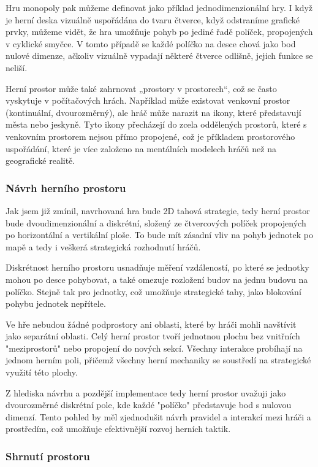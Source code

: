 Hru monopoly pak můžeme definovat jako příklad jednodimenzionální hry. I když je herní deska vizuálně uspořádána do tvaru čtverce, když odstraníme grafické prvky, můžeme vidět, že hra umožňuje pohyb po jediné řadě políček, propojených v cyklické smyčce. V tomto případě se každé políčko na desce chová jako bod nulové dimenze, ačkoliv vizuálně vypadají některé čtverce odlišně, jejich funkce se neliší.

Herní prostor může také zahrnovat „prostory v prostorech“, což se často vyskytuje v počítačových hrách. Například může existovat venkovní prostor (kontinuální, dvourozměrný), ale hráč může narazit na ikony, které představují města nebo jeskyně. Tyto ikony přecházejí do zcela oddělených prostorů, které s venkovním prostorem nejsou přímo propojené, což je příkladem prostorového uspořádání, které je více založeno na mentálních modelech hráčů než na geografické realitě.

\subsubsection{Návrh herního prostoru}

Jak jsem již zmínil, navrhovaná hra bude 2D tahová strategie, tedy herní prostor bude dvoudimenzionální a diskrétní, složený ze čtvercových políček propojených po horizontální a vertikální ploše. To bude mít zásadní vliv na pohyb jednotek po mapě a tedy i veškerá strategická rozhodnutí hráčů.

Diskrétnost herního prostoru usnadňuje měření vzdáleností, po které se jednotky mohou po desce pohybovat, a také omezuje rozložení budov na jednu budovu na políčko. Stejně tak pro jednotky, což umožňuje strategické tahy, jako blokování pohybu jednotek nepřítele.

Ve hře nebudou žádné podprostory ani oblasti, které by hráči mohli navštívit jako separátní oblasti. Celý herní prostor tvoří jednotnou plochu bez vnitřních "meziprostorů" nebo propojení do nových sekcí. Všechny interakce probíhají na jednom herním poli, přičemž všechny herní mechaniky se soustředí na strategické využití této plochy.

Z hlediska návrhu a pozdější implementace tedy herní prostor uvažuji jako dvourozměrné diskrétní pole, kde každé "políčko" představuje bod s nulovou dimenzí. Tento pohled by měl zjednodušit návrh pravidel a interakcí mezi hráči a prostředím, což umožňuje efektivnější rozvoj herních taktik.

\subsubsection{Shrnutí prostoru}

